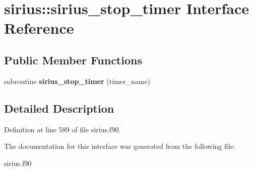 \hypertarget{interfacesirius_1_1sirius__stop__timer}{}\section{sirius\+:\+:sirius\+\_\+stop\+\_\+timer Interface Reference}
\label{interfacesirius_1_1sirius__stop__timer}
\subsection*{Public Member Functions}
\begin{DoxyCompactItemize}
\item 
\hypertarget{interfacesirius_1_1sirius__stop__timer_a6b74e6f79c722f761fd3f93e4fed49a3}{}subroutine {\bfseries sirius\+\_\+stop\+\_\+timer} (timer\+\_\+name)\label{interfacesirius_1_1sirius__stop__timer_a6b74e6f79c722f761fd3f93e4fed49a3}

\end{DoxyCompactItemize}


\subsection{Detailed Description}


Definition at line 589 of file sirius.\+f90.



The documentation for this interface was generated from the following file\+:\begin{DoxyCompactItemize}
\item 
sirius.\+f90\end{DoxyCompactItemize}
